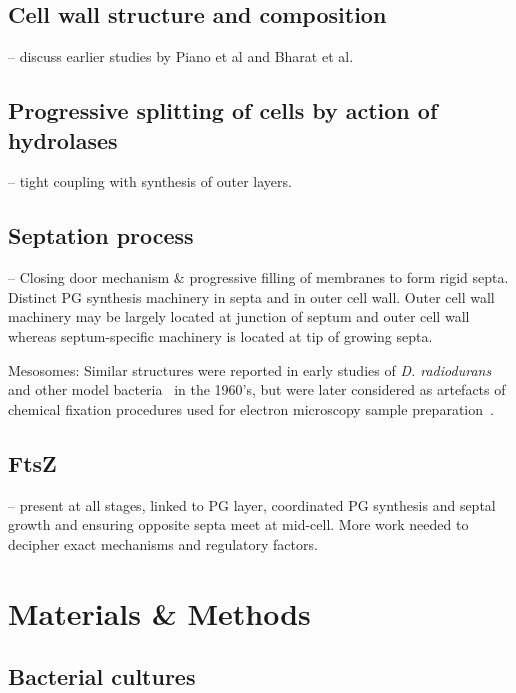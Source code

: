 \subsection{Cell wall structure and composition} -- discuss earlier studies by Piano et al and Bharat et al.

\subsection{Progressive splitting of cells by action of hydrolases} -- tight coupling with synthesis of outer layers.

\subsection{Septation process} -- Closing door mechanism \& progressive filling of membranes to form rigid septa.
Distinct PG synthesis machinery in septa and in outer cell wall.
Outer cell wall machinery may be largely located at junction of septum and outer cell wall whereas septum-specific machinery is located at tip of growing septa.

Mesosomes: Similar structures were reported in early studies of \textit{D. radiodurans}~\cite{thornleyFineStructureMicrococcus1965,sleytrStudyFreezeetchingFine1973} and other model bacteria~\cite{suganumaStudiesFineStructure1966,pontefractMesosomesEscherichiaColi1969} in the 1960's, but were later considered as artefacts of chemical fixation procedures used for electron microscopy sample preparation~\cite{ryterContributionNewCryomethods1988,dubochetElectronMicroscopyFrozenhydrated1983,liedtkeHowAdvancesCryoelectron2022}.

\subsection{FtsZ} -- present at all stages, linked to PG layer, coordinated PG synthesis and septal growth and ensuring opposite septa meet at mid-cell.
More work needed to decipher exact mechanisms and regulatory factors.

\section{Materials \& Methods}

\subsection{Bacterial cultures}

